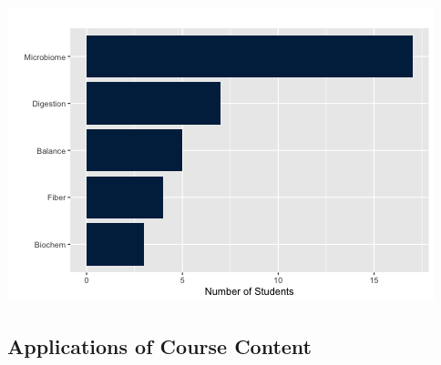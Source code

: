 \documentclass[]{article}
\begin{document}
\includegraphics{figures/qualitative-interests-1.png}

\subsection{Applications of Course
Content}\label{applications-of-course-content}
\end{document}
